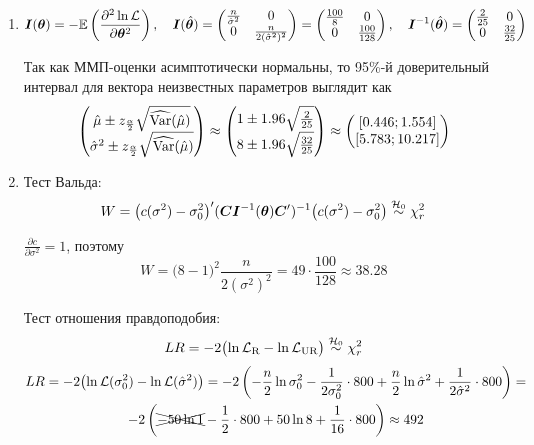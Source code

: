 \begin{problem}
\begin{sol}
\begin{enumerate}
\item
\[
\boldsymbol{I}(\boldsymbol{\theta}) = -\mathbb{E}\left( \frac{\partial^2 \ln \mathcal{L}}{\partial \boldsymbol{\theta}^2} \right), \quad \boldsymbol{I}(\hat{\boldsymbol{\theta}}) = \begin{pmatrix} \frac{n}{\hat\sigma^2} & 0 \\ 0 & \frac{n}{2(\hat\sigma^2)^2} \end{pmatrix} = \begin{pmatrix} \frac{100}{8} & 0 \\ 0 & \frac{100}{128}  \end{pmatrix}, \quad \boldsymbol{I}^{-1}(\hat{\boldsymbol{\theta}}) = \begin{pmatrix} \frac{2}{25} & 0 \\ 0 & \frac{32}{25} \end{pmatrix}
\]

Так как ММП-оценки асимптотически нормальны, то 95\%-й доверительный интервал для вектора неизвестных параметров выглядит как
\[
\begin{pmatrix} \hat\mu \pm z_{\frac{\alpha}{2}} \sqrt{\widehat{\operatorname{Var}}(\hat\mu)} \\ \hat\sigma^2 \pm z_{\frac{\alpha}{2}} \sqrt{\widehat{\operatorname{Var}}(\hat\mu)} \end{pmatrix} \approx \begin{pmatrix} 1 \pm 1.96 \sqrt{\frac{2}{25}} \\ 8 \pm 1.96 \sqrt{\frac{32}{25}} \end{pmatrix} \approx \begin{pmatrix} [0.446; 1.554] \\ [5.783; 10.217] \end{pmatrix}
\]

\item  Тест Вальда:
\[
W = \bigl(c(\sigma^2) - \sigma^2_0 \bigr)' (\boldsymbol{C} \boldsymbol{I}^{-1}(\boldsymbol{\theta}) \boldsymbol{C}')^{-1} \bigl(c(\sigma^2) - \sigma^2_0 \bigr) \mathrel{\stackrel{\mathcal{H}_0}{\sim}} \chi^2_{r}
\]

$\frac{\partial c}{\partial \sigma^2}=1$, поэтому
\[
W = \bigl(8-1 \bigr)^2 \frac{n}{2(\sigma^2)^2} = 49\cdot \frac{100}{128} \approx 38.28
\]

Тест отношения правдоподобия:
\[
LR = -2 \bigl( \ln \mathcal{L}_{\text{R}} - \ln \mathcal{L}_{\text{UR}} \bigr) \mathrel{\stackrel{\mathcal{H}_0}{\sim}} \chi^2_r
\]
\begin{multline*}
LR =  -2 \bigl( \ln \mathcal{L}(\sigma^2_0) - \ln \mathcal{L}(\hat\sigma^2) \bigr)
 = -2 \left( -\frac{n}{2} \ln \sigma^2_0 - \frac{1}{2\sigma^2_0} \cdot 800 + \frac{n}{2} \ln \hat\sigma^2 + \frac{1}{2\hat\sigma^2} \cdot 800 \right) = \\
 -2 \left( \xcancel{-50 \ln 1} - \frac{1}{2} \cdot 800 + 50 \ln 8 + \frac{1}{16} \cdot 800 \right) \approx 492
\end{multline*}


\end{enumerate}
\end{sol}
\end{problem}
